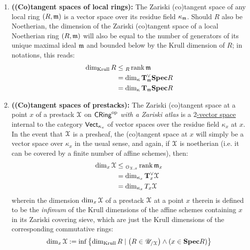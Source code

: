             \begin{proposition} \label{prop: Zariski_tangent_spaces_are_vector_spaces} 
                \noindent
                \begin{enumerate}
                    \item \textbf{\textbf{((Co)tangent spaces of local rings):}} The Zariski (co)tangent space of any local ring $(R, \mathfrak{m})$ is a vector space over its residue field $\kappa_{\mathfrak{m}}$. Should $R$ also be Noetherian, the dimension of the Zariski (co)tangent space of a local Noetherian ring $(R, \mathfrak{m})$ will also be equal to the number of generators of its unique maximal ideal $\mathfrak{m}$ and bounded below by the Krull dimension of $R$; in notations, this reads:
                        $$
                            \begin{aligned}
                                \dim_{\mathrm{Krull}} R & \leq {}_R\operatorname{rank} \mathfrak{m}
                                \\
                                & = \dim_{\kappa} \mathbf{T}^{\vee}_{\mathfrak{m}} \mathbf{Spec} R
                                \\
                                & = \dim_{\kappa} \mathbf{T}_{\mathfrak{m}} \mathbf{Spec} R
                            \end{aligned}
                        $$
                    \item \textbf{((Co)tangent spaces of prestacks):} The Zariski (co)tangent space at a point $x$ of a prestack $\mathcal{X}$ on $\mathsf{CRing}^{\mathrm{op}}$ \textit{with a Zariski atlas} is a \href{https://ncatlab.org/nlab/show/2-vector+space}{\underline{$2$-vector space}} internal to the category $\mathsf{Vect}_{\kappa_x}$ of vector spaces over the residue field $\kappa_x$ at $x$. In the event that $\mathcal{X}$ is a presheaf, the (co)tangent space at $x$ will simply be a vector space over $\kappa_x$ in the usual sense, and again, if $\mathcal{X}$ is noetherian (i.e. it can be covered by a finite number of affine schemes), then:
                        $$
                            \begin{aligned}
                                \dim_x \mathcal{X} & \leq {}_{\mathcal{O}_{\mathcal{X}, x}}\operatorname{rank} \mathfrak{m}_x
                                \\
                                & = \dim_{\kappa_x} \mathbf{T}^{\vee}_x \mathcal{X}
                                \\
                                & = \dim_{\kappa_x} T_x \mathcal{X}
                            \end{aligned}
                        $$
                    wherein the dimension $\dim_x \mathcal{X}$ of a prestack $\mathcal{X}$ at a point $x$ therein is defined to be the \textit{infimum} of the Krull dimensions of the affine schemes containing $x$ in its Zariski covering sieve, which are just the Krull dimensions of the corresponding commutative rings:
                        $$\dim_x \mathcal{X} := \inf \left\{ \dim_{\mathrm{Krull}} R \mid \left(R \in \mathscr{U}_{/\mathcal{X}}\right) \wedge (x \in \mathbf{Spec} R) \right\}$$
                \end{enumerate}
            \end{proposition}
